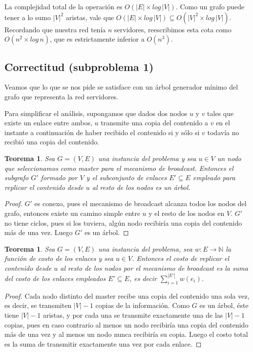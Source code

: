 \documentclass[a4paper, 10pt, twoside]{article}
\begin{document}
La complejidad total de la operación es $O(|E| \times log\, |V|)$. Como un grafo puede tener a lo sumo $|V|^2$ aristas, vale que $O(|E| \times log\, |V|) \subseteq O(|V|^2 \times log\, |V|)$. Recordando que nuestra red tenía $n$ servidores, reescribimos esta cota como $O(n^2 \times log\, n)$, que es estrictamente inferior a $O(n^3)$.


\subsection{Correctitud (subproblema 1)}

Veamos que lo que se nos pide se satisface con un árbol generador mínimo del grafo que representa la red servidores.

Para simplificar el análisis, supongamos que dados dos nodos $u$ y $v$ tales que existe un enlace entre ambos, $u$ transmite una copia del contenido a $v$ en el instante a continuación de haber recibido el contenido si y sólo si $v$ todavía no recibió una copia del contenido.

\newtheorem*{2a-arbol}{Teorema}
\begin{2a-arbol}
  Sea $G = (V, E)$ una instancia del problema y sea $u \in V$ un nodo que seleccionamos como master para el mecanismo de broadcast. Entonces el subgrafo $G'$ formado por $V$ y el subconjunto de enlaces $E' \subseteq E$ empleado para replicar el contenido desde $u$ al resto de los nodos es un árbol.
\end{2a-arbol}

\begin{proof}
  $G'$ es conexo, pues el mecanismo de broadcast alcanza todos los nodos del grafo, entonces existe un camino simple entre $u$ y el resto de los nodos en $V$. $G'$ no tiene ciclos, pues si los tuviera, algún nodo recibiría una copia del contenido más de una vez. Luego $G'$ es un árbol.
\end{proof}

\newtheorem*{2a-costo}{Teorema}
\begin{2a-costo}
  Sea $G = (V, E)$ una instancia del problema, sea $w: E \rightarrow \mathbb{N}$ la función de costo de los enlaces y sea $u \in V$. Entonces el costo de replicar el contenido desde $u$ al resto de los nodos por el mecanismo de broadcast es la suma del costo de los enlaces empleados $E' \subseteq E$, es decir $\sum_{i=1}^{|E'|} w(e_i)$.
\end{2a-costo}

\begin{proof}
  Cada nodo distinto del master recibe una copia del contenido una sola vez, es decir, se transmiten $|V| - 1$ copias de la información. Como $G$ es un árbol, éste tiene $|V| - 1$ aristas, y por cada una se transmite exactamente una de las $|V| - 1$ copias, pues en caso contrario al menos un nodo recibiría una copia del contenido más de una vez y al menos un nodo nunca recibiría su copia. Luego el costo total es la suma de transmitir exactamente una vez por cada enlace.
\end{proof}
\end{document}
